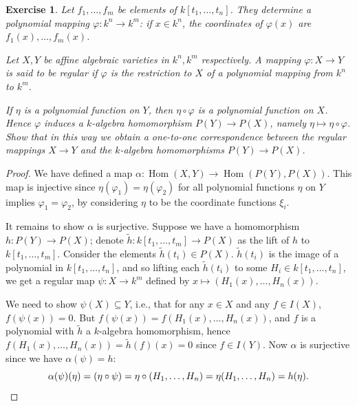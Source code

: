 \documentclass[12pt,letterpaper]{article}
\newtheorem{problem}{Exercise}[section]
\theoremstyle{definition}
\theoremstyle{remark}
\numberwithin{figure}{problem}
\numberwithin{equation}{section}
\DeclareMathOperator{\Hom}{Hom}
\begin{document}
\begin{problem}
  Let $f_1,\ldots,f_m$ be elements of $k[t_1,\ldots,t_n]$. They determine a \emph{polynomial mapping} $\varphi \colon k^n \to k^m$: if $x \in k^n$, the coordinates of $\varphi(x)$ are $f_1(x),\ldots,f_m(x)$.
  \par Let $X,Y$ be affine algebraic varieties in $k^n,k^m$ respectively. A mapping $\varphi\colon X \to Y$ is said to be \emph{regular} if $\varphi$ is the restriction to $X$ of a polynomial mapping from $k^n$ to $k^m$.
  \par If $\eta$ is a polynomial function on $Y$, then $\eta \circ \varphi$ is a polynomial function on $X$. Hence $\varphi$ induces a $k$-algebra homomorphism $P(Y) \to P(X)$, namely $\eta \mapsto \eta \circ \varphi$. Show that in this way we obtain a one-to-one correspondence between the regular mappings $X \to Y$ and the $k$-algebra homomorphisms $P(Y) \to P(X)$.
\end{problem}
\begin{proof}
  We have defined a map $\alpha\colon\Hom(X,Y) \to \Hom(P(Y),P(X))$. This map is injective since $\eta(\varphi_1) = \eta(\varphi_2)$ for all polynomial functions $\eta$ on $Y$ implies $\varphi_1 = \varphi_2$, by considering $\eta$ to be the coordinate functions $\xi_i$.
  \par It remains to show $\alpha$ is surjective. Suppose we have a homomorphism $h \colon P(Y) \to P(X)$; denote $\tilde{h}\colon k[t_1,\ldots,t_m] \to P(X)$ as the lift of $h$ to $k[t_1,\ldots,t_m]$. Consider the elements $\tilde{h}(t_i) \in P(X)$. $\tilde{h}(t_i)$ is the image of a polynomial in $k[t_1,\ldots,t_n]$, and so lifting each $\tilde{h}(t_i)$ to some $H_i \in k[t_1,\ldots,t_n]$, we get a regular map $\psi \colon X \to k^m$ defined by $x \mapsto (H_1(x),\ldots,H_n(x))$.
  \par We need to show $\psi(X) \subseteq Y$, i.e., that for any $x \in X$ and any $f \in I(X)$, $f(\psi(x)) = 0$. But $f(\psi(x)) = f(H_1(x),\ldots,H_n(x))$, and $f$ is a polynomial with $\tilde{h}$ a $k$-algebra homomorphism, hence $f(H_1(x),\ldots,H_n(x)) = \tilde{h}(f)(x) = 0$ since $f \in I(Y)$. Now $\alpha$ is surjective since we have $\alpha(\psi) = h$:
  \begin{equation*}
    \alpha(\psi)(\eta) = (\eta \circ \psi) = \eta \circ (H_1,\ldots,H_n) = \eta(H_1,\ldots,H_n) = h(\eta).\qedhere
  \end{equation*}
\end{proof}

\printbibliography
\end{document}
